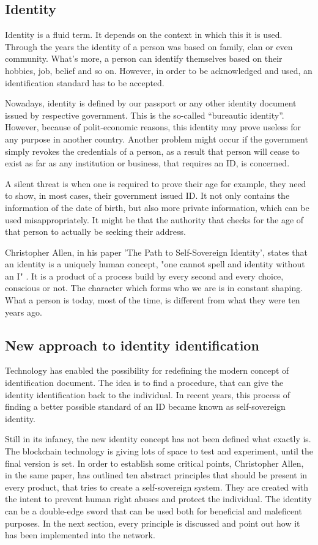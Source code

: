 \documentclass[a4paper,11pt]{report}
\begin{document}
\subsection{Identity}
 Identity is a fluid term. It depends on the context in which this it is used. Through the years the identity of a person was based on family, clan or even community. What's more, a person can identify themselves based on their hobbies, job, belief and so on. However, in order to be acknowledged and used, an identification standard has to be accepted. 

Nowadays, identity is defined by our passport or any other identity document issued by respective government. This is the so-called “bureautic identity”. However, because of polit-economic reasons, this identity may prove useless for any purpose in another country. Another problem might occur if the government simply revokes the credentials of a person, as a result that person will cease to exist as far as any institution or business, that requires an ID, is concerned.

A silent threat is when one is required to prove their age for example, they need to show, in most cases, their government issued ID. It not only contains the information of the date of birth, but also more private information, which can be used misappropriately. It might be that the authority that checks for the age of that person to actually be seeking their address.  

Christopher Allen, in his paper 'The Path to Self-Sovereign Identity', states that an identity is a uniquely human concept, "one cannot spell and identity without an I" \cite{allen2016path}. It is a product of a process build by every second and every choice, conscious or not. The character which forms who we are is in constant shaping. What a person is today, most of the time, is different from what they were ten years ago. 

\subsection{New approach to identity identification}

Technology has enabled the possibility for redefining the modern concept of identification document. The idea is to find a procedure, that can give the identity identification back to the individual. In recent years, this process of finding a better possible standard of an ID became known as self-sovereign identity. 

Still in its infancy, the new identity concept has not been defined what exactly is. The blockchain technology is giving lots of space to test and experiment, until the final version is set. In order to establish some critical points, Christopher Allen, in the same paper, has outlined ten abstract principles that should be present in every product, that tries to create a self-sovereign system. They are created with the intent to prevent human right abuses and protect the individual. The identity can be a double-edge sword that can be used both for beneficial and maleficent purposes. In the next section, every principle is discussed and point out how it has been implemented into the network.  
\end{document}
